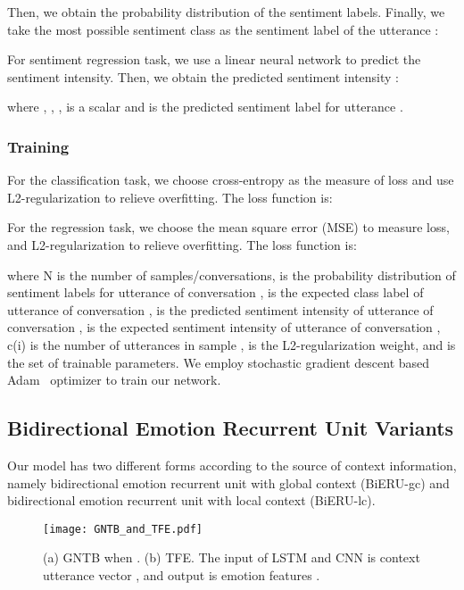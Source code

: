 \documentclass[journal]{IEEEtran}
\begin{document}
Then, we obtain the probability distribution  of the sentiment labels. Finally, we take the most possible sentiment class as the sentiment label of the utterance :


For sentiment regression task, we use a linear neural network  to predict the sentiment intensity. Then, we obtain the predicted sentiment intensity :

where , , ,  is a scalar and  is the predicted sentiment label for utterance .

\subsubsection{Training}
For the classification task, we choose cross-entropy as the measure of loss and use L2-regularization to relieve overfitting. The loss function is:


For the regression task, we choose the mean square error (MSE) to measure loss, and L2-regularization to relieve overfitting. The loss function is:

where N is the number of samples/conversations,  is the probability distribution of sentiment labels for utterance  of conversation ,  is the expected class label of utterance  of conversation ,  is the predicted sentiment intensity of utterance  of conversation ,  is the expected sentiment intensity of utterance  of conversation , c(i) is the number of utterances in sample ,  is the L2-regularization weight, and  is the set of trainable parameters. We employ stochastic gradient descent based Adam~\cite{kingma2014adam} optimizer to train our network.


\subsection{Bidirectional Emotion Recurrent Unit Variants}
Our model has two different forms according to the source of context information, namely bidirectional emotion recurrent unit with global context (BiERU-gc) and bidirectional emotion recurrent unit with local context (BiERU-lc).

\begin{figure}[!ht]
\centering\texttt{[image: GNTB\_and\_TFE.pdf]}
\caption{(a) GNTB when . (b) TFE. The input of LSTM and CNN is context utterance vector , and output is emotion features .}
\label{fig:ntb_and_tfe}
\end{figure}
\end{document}
